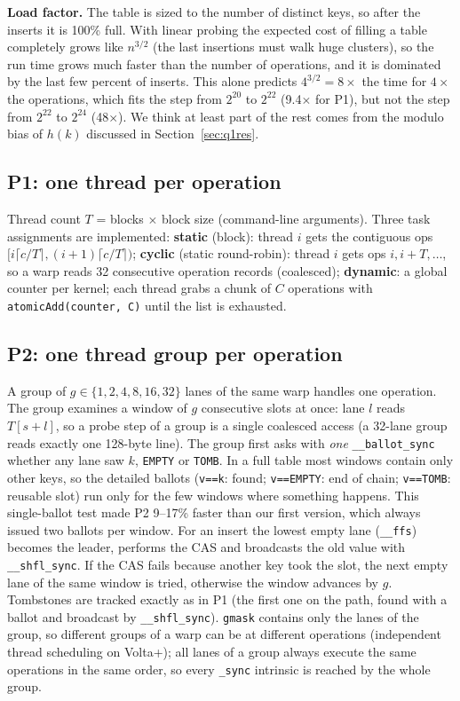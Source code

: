 \documentclass[10pt,a4paper]{article}
\begin{document}
\textbf{Load factor.} The table is sized to the number of distinct keys, so
after the inserts it is 100\% full. With linear probing the expected cost of
filling a table completely grows like $n^{3/2}$ (the last insertions must
walk huge clusters), so the run time grows much faster than the number of
operations, and it is dominated by the last few percent of inserts. This
alone predicts $4^{3/2}=8\times$ the time for $4\times$ the operations, which fits
the step from $2^{20}$ to $2^{22}$ (9.4$\times$ for P1), but not the step from
$2^{22}$ to $2^{24}$ (48$\times$). We think at least part of the rest comes from the
modulo bias of $h(k)$ discussed in Section~\ref{sec:q1res}.

\subsection{P1: one thread per operation}
Thread count $T$ = blocks $\times$ block size (command-line arguments). Three
task assignments are implemented:
\textbf{static} (block): thread $i$ gets the contiguous ops
$[i\lceil c/T\rceil, (i+1)\lceil c/T\rceil)$;
\textbf{cyclic} (static round-robin): thread $i$ gets ops $i, i+T, \dots$, so a
warp reads 32 consecutive operation records (coalesced);
\textbf{dynamic}: a global counter per kernel; each thread grabs a chunk of
$C$ operations with \texttt{atomicAdd(counter, C)} until the list is exhausted.

\subsection{P2: one thread group per operation}
A group of $g\in\{1,2,4,8,16,32\}$ lanes of the same warp handles one
operation. The group examines a window of $g$ consecutive slots at once: lane
$l$ reads $T[s+l]$, so a probe step of a group is a single coalesced access (a
32-lane group reads exactly one 128-byte line). The group first asks with
\emph{one} \texttt{\_\_ballot\_sync} whether any lane saw $k$, \texttt{EMPTY} or
\texttt{TOMB}. In a full table most windows contain only other keys, so the
detailed ballots (\texttt{v==k}: found; \texttt{v==EMPTY}: end of chain;
\texttt{v==TOMB}: reusable slot) run only for the few windows where something
happens. This single-ballot test made P2 9--17\% faster than our first version,
which always issued two ballots per window. For an insert the lowest empty lane
(\texttt{\_\_ffs}) becomes the leader, performs the CAS and broadcasts the old
value with \texttt{\_\_shfl\_sync}. If the CAS fails because another key took
the slot, the next empty lane of the same window is tried, otherwise the window
advances by $g$. Tombstones are tracked exactly as in P1 (the first one on the
path, found with a ballot and broadcast by \texttt{\_\_shfl\_sync}).
\texttt{gmask} contains only the lanes of the group, so different groups of a
warp can be at different operations (independent thread scheduling on Volta+);
all lanes of a group always execute the same operations in the same order, so
every \texttt{\_sync} intrinsic is reached by the whole group.
\end{document}
